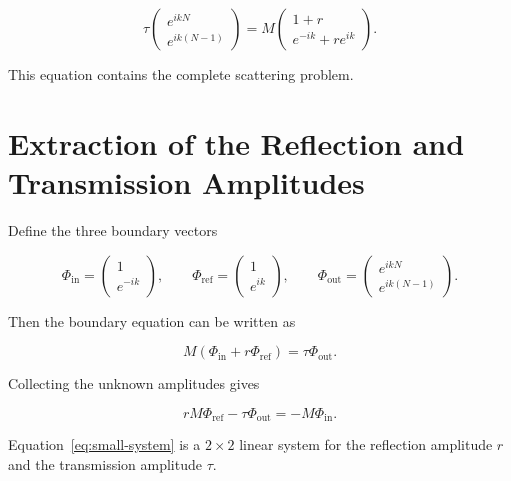 \begin{equation}
	\tau
	\begin{pmatrix}
		e^{ikN} \\
		e^{ik(N-1)}
	\end{pmatrix}
	=
	M
	\begin{pmatrix}
		1+r \\
		e^{-ik}+r e^{ik}
	\end{pmatrix}.
	\label{eq:transfer-boundary}
\end{equation}

This equation contains the complete scattering problem.


\section{Extraction of the Reflection and Transmission Amplitudes}

Define the three boundary vectors

\begin{equation}
	\Phi_{\mathrm{in}}
	=
	\begin{pmatrix}
		1 \\
		e^{-ik}
	\end{pmatrix},
	\qquad
	\Phi_{\mathrm{ref}}
	=
	\begin{pmatrix}
		1 \\
		e^{ik}
	\end{pmatrix},
	\qquad
	\Phi_{\mathrm{out}}
	=
	\begin{pmatrix}
		e^{ikN} \\
		e^{ik(N-1)}
	\end{pmatrix}.
\end{equation}

Then the boundary equation can be written as

\begin{equation}
	M
	\left(
	\Phi_{\mathrm{in}}
	+
	r\Phi_{\mathrm{ref}}
	\right)
	=
	\tau
	\Phi_{\mathrm{out}}.
\end{equation}

Collecting the unknown amplitudes gives

\begin{equation}
	rM\Phi_{\mathrm{ref}}
	-
	\tau\Phi_{\mathrm{out}}
	=
	-
	M\Phi_{\mathrm{in}}.
	\label{eq:small-system}
\end{equation}

Equation~\eqref{eq:small-system} is a $2\times2$ linear system for the
reflection amplitude $r$ and the transmission amplitude $\tau$.

